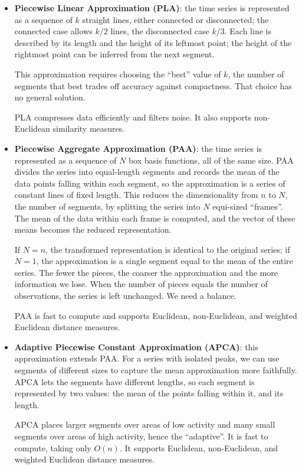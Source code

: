 \begin{itemize}
    \item \textbf{Piecewise Linear Approximation (PLA)}: the time series is represented as a sequence of $k$ straight lines, either connected or disconnected; the connected case allows $k/2$ lines, the disconnected case $k/3$. Each line is described by its length and the height of its leftmost point; the height of the rightmost point can be inferred from the next segment.

    This approximation requires choosing the ``best'' value of $k$, the number of segments that best trades off accuracy against compactness. That choice has no general solution.

    PLA compresses data efficiently and filters noise. It also supports non-Euclidean similarity measures.

    \item \textbf{Piecewise Aggregate Approximation (PAA)}: the time series is represented as a sequence of $N$ box basis functions, all of the same size. PAA divides the series into equal-length segments and records the mean of the data points falling within each segment, so the approximation is a series of constant lines of fixed length. This reduces the dimensionality from $n$ to $N$, the number of segments, by splitting the series into $N$ equi-sized ``frames''. The mean of the data within each frame is computed, and the vector of these means becomes the reduced representation.

    If $N=n$, the transformed representation is identical to the original series; if $N=1$, the approximation is a single segment equal to the mean of the entire series. The fewer the pieces, the coarser the approximation and the more information we lose. When the number of pieces equals the number of observations, the series is left unchanged. We need a balance.

    PAA is fast to compute and supports Euclidean, non-Euclidean, and weighted Euclidean distance measures.
    
    \item \textbf{Adaptive Piecewise Constant Approximation (APCA)}: this approximation extends PAA. For a series with isolated peaks, we can use segments of different sizes to capture the mean approximation more faithfully. APCA lets the segments have different lengths, so each segment is represented by two values: the mean of the points falling within it, and its length.

    APCA places larger segments over areas of low activity and many small segments over areas of high activity, hence the ``adaptive''. It is fast to compute, taking only $O(n)$. It supports Euclidean, non-Euclidean, and weighted Euclidean distance measures.


\end{itemize}
